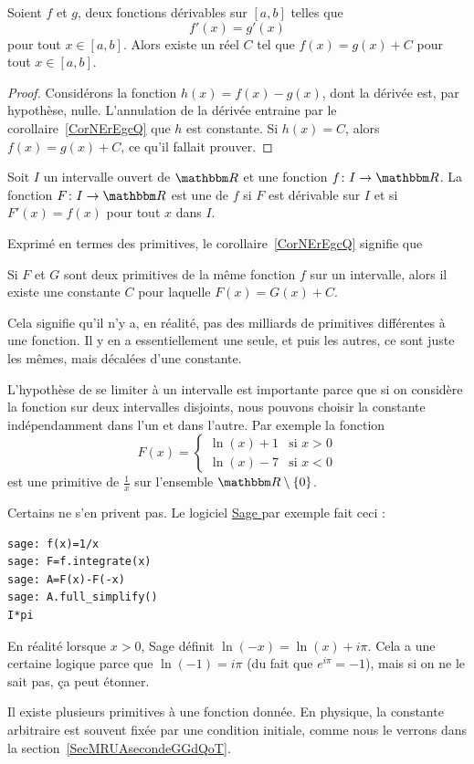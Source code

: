 \begin{corollary}   \label{CorNErEgcQ}
    Soient $f$ et $g$, deux fonctions dérivables sur $[a,b]$ telles que
    \begin{equation}
        f'(x) = g'(x)
    \end{equation}
    pour tout $x \in [a,b]$. Alors existe un réel $C$ tel que $f (x) = g (x) + C$ pour tout $x\in [a,b]$.
\end{corollary}

\begin{proof}
    Considérons la fonction $h(x)=f(x)-g(x)$, dont la dérivée est, par hypothèse, nulle. L'annulation de la dérivée entraine par le corollaire~\ref{CorNErEgcQ} que $h$ est  constante. Si $h(x)=C$, alors $f(x)=g(x)+C$, ce qu'il fallait prouver.
\end{proof}

\begin{definition}  \label{DefXVMVooWhsfuI}
    Soit \( I\) un intervalle ouvert de \( \eR\) et une fonction \( f\colon I\to \eR\). La fonction \( F\colon I\to \eR\) est une  de \( f\) si \( F\) est dérivable sur \( I\) et si \( F'(x)=f(x)\) pour tout \( x\) dans \( I\).
\end{definition}

Exprimé en termes des primitives, le corollaire~\ref{CorNErEgcQ} signifie que
\begin{corollary}  \label{CorZeroCst}
    Si $F$ et $G$ sont deux primitives de la même fonction $f$ sur un intervalle, alors il existe une constante $C$ pour laquelle $F(x)=G(x)+C$.
\end{corollary}
Cela signifie qu'il n'y a, en réalité, pas des milliards de primitives différentes à une fonction. Il y en a essentiellement une seule, et puis les autres, ce sont juste les mêmes, mais décalées d'une constante.

\begin{remark}
    L'hypothèse de se limiter à un intervalle est importante parce que si on considère la fonction sur deux intervalles disjoints, nous pouvons choisir la constante indépendamment dans l'un et dans l'autre. Par exemple la fonction
    \begin{equation}
        F(x)=\begin{cases}
            \ln(x)+1    &   \text{si } x>0\\
            \ln(x)-7    &    \text{si } x<0
        \end{cases}
    \end{equation}
    est une primitive de \( \frac{1}{ x }\) sur l'ensemble \( \eR\setminus\{ 0 \}\).

    Certains ne s'en privent pas. Le logiciel \href{https://www.sagemath.org}{ Sage } par exemple fait ceci :
    \begin{verbatim}
sage: f(x)=1/x
sage: F=f.integrate(x)
sage: A=F(x)-F(-x)
sage: A.full_simplify()
I*pi
    \end{verbatim}
    En réalité lorsque \( x>0\), Sage définit \( \ln(-x)=\ln(x)+i\pi\). Cela a une certaine logique parce que \( \ln(-1)=i\pi\) (du fait que \(  e^{i\pi}=-1\)), mais si on ne le sait pas, ça peut étonner.
\end{remark}

\begin{normaltext}
    Il existe plusieurs primitives à une fonction donnée. En physique, la constante arbitraire est souvent fixée par une condition initiale, comme nous le verrons dans la section~\ref{SecMRUAsecondeGGdQoT}.
\end{normaltext}